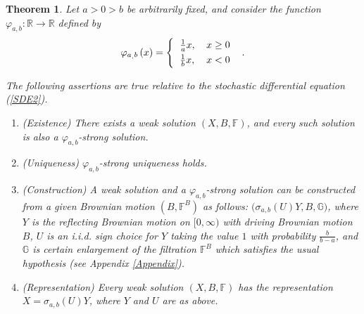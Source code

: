 \documentclass[reqno]{amsart}
\newtheorem{theorem}{Theorem}[section]
\theoremstyle{definition}
\theoremstyle{remark}
\numberwithin{equation}{section}
\begin{document}
\begin{theorem}\label{theorem 1}
Let $a>0>b$ be arbitrarily fixed, and consider the function $\varphi _{a,b}:\mathbb R\rightarrow \mathbb R$ defined by
\begin{equation}\label{definition of varphi}
\varphi _{a_{,}b}\left( x\right) =
\left\{
\begin{tabular}{ll}
$\frac{1}{a}x,$ & $x\geq 0$ \vspace{3pt}\\
$\frac{1}{b}x,$ & $x<0$\end{tabular}\right. .
\end{equation}

The following assertions are true relative to the stochastic differential equation (\ref{SDE2}).
\begin{enumerate}
\item (Existence) There exists a weak solution $(X,B,\mathbb{F})$, and every such solution is also a $\varphi_{a,b}$-strong solution.

\item (Uniqueness) $\varphi_{a,b}$-strong uniqueness holds.

\item (Construction) A weak solution and a $\varphi_{a,b}$-strong solution can be constructed from a given Brownian motion $(B,\mathbb{F}^B)$ as follows: $\big( \sigma _{a,b}\left( U\right)Y,B,\mathbb{G}\big) $, where $Y$ is the reflecting Brownian motion on $[0,\infty )$ with driving Brownian motion $B$, $U$ is an i.i.d. sign choice for $Y$ taking the value $1$ with probability $\frac{b}{b-a}$, and $\mathbb{G}$ is certain enlargement of the filtration $\mathbb{F}^B$ which satisfies the usual hypothesis (see Appendix \ref{Appendix}).

\item (Representation) Every weak solution $(X,B,\mathbb{F})$ has the representation $X=\sigma_{a,b}(U) Y$, where $Y$ and $U$ are as above.
\end{enumerate}
\end{theorem}
\end{document}
